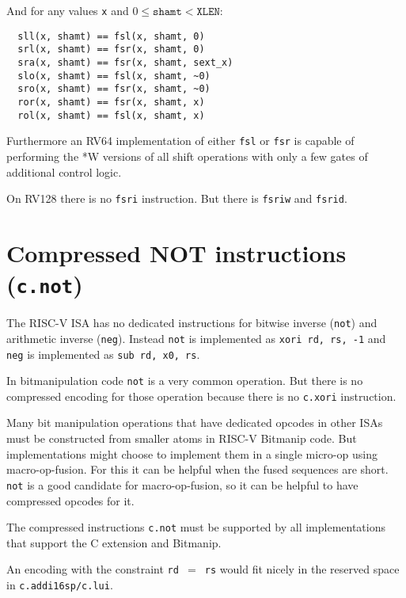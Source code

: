And for any values {\tt x} and $0 \le \texttt{shamt} < \texttt{XLEN}$:

\begin{minipage}{\linewidth}
\begin{verbatim}
  sll(x, shamt) == fsl(x, shamt, 0)
  srl(x, shamt) == fsr(x, shamt, 0)
  sra(x, shamt) == fsr(x, shamt, sext_x)
  slo(x, shamt) == fsl(x, shamt, ~0)
  sro(x, shamt) == fsr(x, shamt, ~0)
  ror(x, shamt) == fsr(x, shamt, x)
  rol(x, shamt) == fsl(x, shamt, x)
\end{verbatim}
\end{minipage}

Furthermore an RV64 implementation of either {\tt fsl} or {\tt fsr} is capable
of performing the *W versions of all shift operations with only a few gates
of additional control logic.

On RV128 there is no {\tt fsri} instruction. But there is {\tt fsriw} and {\tt fsrid}.


\section{Compressed NOT instructions (\texttt{c.not})}

The RISC-V ISA has no dedicated instructions for bitwise inverse (\texttt{not})
and arithmetic inverse (\texttt{neg}). Instead \texttt{not} is implemented as
\texttt{xori\ rd,\ rs,\ -1} and \texttt{neg} is implemented as \texttt{sub\ rd,\ x0,\ rs}.

In bitmanipulation code \texttt{not} is a very common operation. But there is
no compressed encoding for those operation because there is no \texttt{c.xori}
instruction.

Many bit manipulation operations that have dedicated opcodes in other ISAs
must be constructed from smaller atoms in RISC-V Bitmanip code. But
implementations might choose to implement them in a single micro-op using
macro-op-fusion. For this it can be helpful when the fused sequences are short.
\texttt{not} is a good candidate for macro-op-fusion, so it can be helpful to
have compressed opcodes for it.

The compressed instructions \texttt{c.not} must be supported by all
implementations that support the C extension and Bitmanip.

An encoding with the constraint \texttt{rd $=$ rs} would fit nicely in the reserved
space in \texttt{c.addi16sp/c.lui}.

